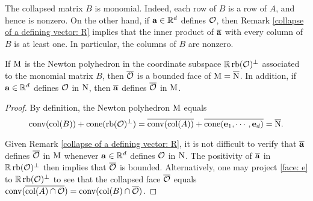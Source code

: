 \documentclass[11pt]{amsart}
\renewcommand{\!}[1]{{\color{red}\text{$\star$\,}#1\,$\star$}}
\newcommand{\ol}[1]{\overline{#1}}
\begin{document}
\begin{remark}
\label{collapse of monomial is monomial: R}
The collapsed matrix $B$ is monomial.  Indeed, each row of $B$ is a row of $A$, and hence is nonzero.   On the other hand, if $\mathbf{a} \in \mathbb{R}^d$ defines $\mathcal{O}$, then Remark \ref{collapse of a defining vector: R} implies that the inner product of $\ol{\vv{a}}$ with every column of $B$ is at least one.  In particular, the columns of $B$ are nonzero.
\end{remark}


%


\begin{lemma}
\label{collapse of Newton polyhedron: L} 
If $\mathrm{M}$ is the Newton polyhedron in the coordinate subspace $\mathbb{R} \operatorname{rb}(\mathcal{O})^{\perp}$ associated to the monomial matrix $B$, then $\ol{\O}$ is a bounded face of $\M = \ol{\N}$.    In addition, if $\mathbf{a} \in \mathbb{R}^d$ defines $\mathcal{O}$ in $\mathrm{N}$, then $ \ol{\vv{a}}$ defines $\ol{\O}$ in $\mathrm{M}$. 
\end{lemma}

\begin{proof}
By definition, the Newton polyhedron $\mathrm{M}$ equals
%
\[  \conv( \col(B) ) + \cone(\rb(\O)^{\perp}) =  \ol{\conv( \col(A))} + \ol{\cone(\vv{e}_1, \cdots, \vv{e}_d)} =  \ol{\N}.\]

Given Remark \ref{collapse of a defining vector: R}, it is not difficult to verify that $\ol{\vv{a}}$ defines $\ol{\O}$ in $\mathrm{M}$ whenever $\mathbf{a} \in \mathbb{R}^d$ defines $\mathcal{O}$ in $\mathrm{N}$.  The positivity of $\ol{\vv{a}}$ in $\mathbb{R} \operatorname{rb}(\mathcal{O})^{\perp}$ then implies that $\ol{\O}$ is bounded.  Alternatively, one may project \eqref{face: e} to $\mathbb{R} \operatorname{rb}(\mathcal{O})^{\perp}$ to see that the collapsed face $\ol{\O}$ equals $\conv( \ol{ \col(A) \cap \O}) = \conv( \col(B) \cap \ol{\O})$.  
\end{proof}
\end{document}
